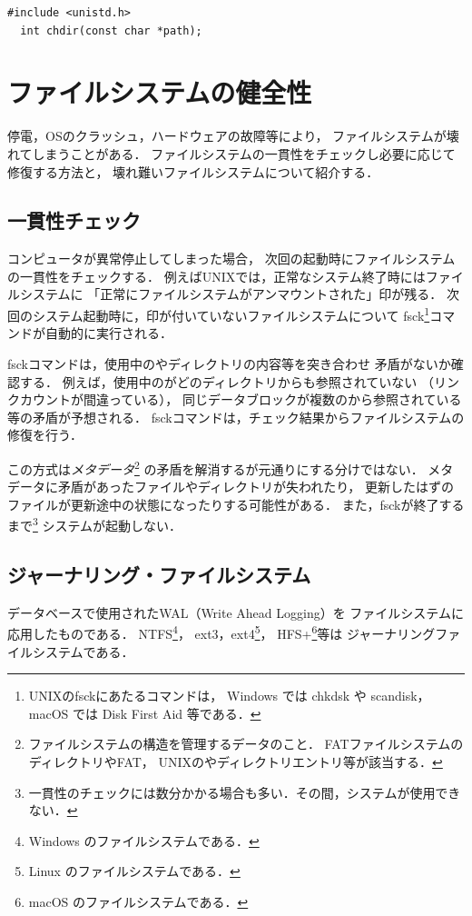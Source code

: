 \begin{lstlisting}[numbers=none]
  #include <unistd.h>
  int chdir(const char *path);
\end{lstlisting}

\section{ファイルシステムの健全性}
停電，OSのクラッシュ，ハードウェアの故障等により，
ファイルシステムが壊れてしまうことがある．
ファイルシステムの一貫性をチェックし必要に応じて修復する方法と，
壊れ難いファイルシステムについて紹介する．

\subsection{一貫性チェック}
\label{unmountFlag}
コンピュータが異常停止してしまった場合，
次回の起動時にファイルシステムの一貫性をチェックする．
例えばUNIXでは，正常なシステム終了時にはファイルシステムに
「正常にファイルシステムがアンマウントされた」印が残る．
次回のシステム起動時に，印が付いていないファイルシステムについて
fsck\footnote{
  UNIXのfsckにあたるコマンドは，
  Windows では chkdsk や scandisk，macOS では Disk First Aid 等である．
}コマンドが自動的に実行される．

fsckコマンドは，使用中の\inode やディレクトリの内容等を突き合わせ
矛盾がないか確認する．
例えば，使用中の\inode がどのディレクトリからも参照されていない
（リンクカウントが間違っている），
同じデータブロックが複数の\inode から参照されている等の矛盾が予想される．
fsckコマンドは，チェック結果からファイルシステムの修復を行う．

この方式は\emph{メタデータ}\footnote{
  ファイルシステムの構造を管理するデータのこと．
  FATファイルシステムのディレクトリやFAT，
  UNIXの\inode やディレクトリエントリ等が該当する．}
の矛盾を解消するが元通りにする分けではない．
メタデータに矛盾があったファイルやディレクトリが失われたり，
更新したはずのファイルが更新途中の状態になったりする可能性がある．
また，fsckが終了するまで\footnote{
  一貫性のチェックには数分かかる場合も多い．その間，システムが使用できない．}
システムが起動しない．

\subsection{ジャーナリング・ファイルシステム}
データベースで使用されたWAL（Write Ahead Logging）を
ファイルシステムに応用したものである．
NTFS\footnote{Windows のファイルシステムである．}，
ext3，ext4\footnote{Linux のファイルシステムである．}，
HFS+\footnote{macOS のファイルシステムである．}等は
ジャーナリングファイルシステムである．

